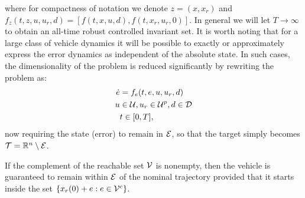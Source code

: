 where for compactness of notation we denote $z=(x,x_r)$ and $f_z(t,z,u,u_r,d) = [f(t,x,u,d),f(t,x_r,u_r,0)]$. In general we will let $T\to\infty$ to obtain an all-time robust controlled invariant set.
It is worth noting that for a large class of vehicle dynamics it will be possible to exactly or approximately express the error dynamics as independent of the absolute state. In such cases, the dimensionality of the problem is reduced significantly by rewriting the problem as:
\begin{equation}
\label{eq:edyn} %
\begin{aligned}
\dot{e} &= f_e(t, e, u, u_r,d) \\
u &\in \cset, u_r\in\cset^p, d \in \dset \\
&t \in [0, T],
\end{aligned}
\end{equation}
now requiring the state (error) to remain in $\mathcal{E}$, so that the target simply becomes $\mathcal{T} = \mathbb{R}^n \setminus \mathcal{E}$.

If the complement of the reachable set $\mathcal{V}$ is nonempty, then the vehicle is guaranteed to remain within $\mathcal{E}$ of the nominal trajectory provided that it starts inside the set $\{x_r(0) + e: e\in{\mathcal{V}^c}\}$.